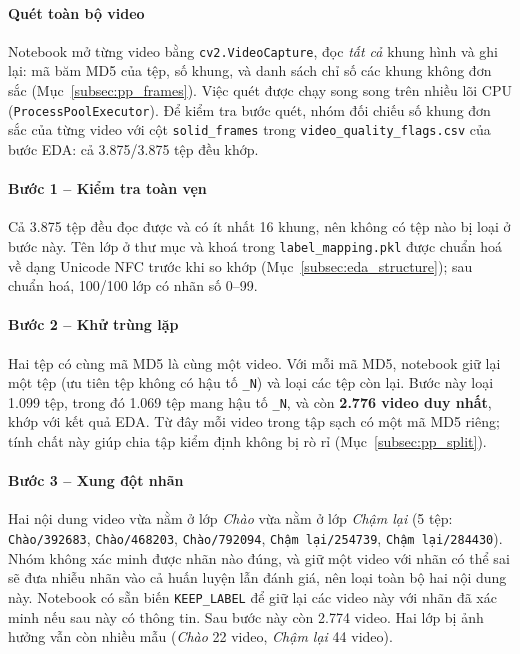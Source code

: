 \paragraph{Quét toàn bộ video} Notebook mở từng video bằng \texttt{cv2.VideoCapture}, đọc \emph{tất cả} khung hình và ghi lại: mã băm MD5 của tệp, số khung, và danh sách chỉ số các khung không đơn sắc (Mục~\ref{subsec:pp_frames}). Việc quét được chạy song song trên nhiều lõi CPU (\texttt{ProcessPoolExecutor}). Để kiểm tra bước quét, nhóm đối chiếu số khung đơn sắc của từng video với cột \texttt{solid\_frames} trong \texttt{video\_quality\_flags.csv} của bước EDA: cả 3.875/3.875 tệp đều khớp.

\paragraph{Bước 1 -- Kiểm tra toàn vẹn} Cả 3.875 tệp đều đọc được và có ít nhất 16 khung, nên không có tệp nào bị loại ở bước này. Tên lớp ở thư mục và khoá trong \texttt{label\_mapping.pkl} được chuẩn hoá về dạng Unicode NFC trước khi so khớp (Mục~\ref{subsec:eda_structure}); sau chuẩn hoá, 100/100 lớp có nhãn số 0--99.

\paragraph{Bước 2 -- Khử trùng lặp} Hai tệp có cùng mã MD5 là cùng một video. Với mỗi mã MD5, notebook giữ lại một tệp (ưu tiên tệp không có hậu tố \texttt{\_N}) và loại các tệp còn lại. Bước này loại 1.099 tệp, trong đó 1.069 tệp mang hậu tố \texttt{\_N}, và còn \textbf{2.776 video duy nhất}, khớp với kết quả EDA. Từ đây mỗi video trong tập sạch có một mã MD5 riêng; tính chất này giúp chia tập kiểm định không bị rò rỉ (Mục~\ref{subsec:pp_split}).

\paragraph{Bước 3 -- Xung đột nhãn} Hai nội dung video vừa nằm ở lớp \textit{Chào} vừa nằm ở lớp \textit{Chậm lại} (5 tệp: \texttt{Chào/392683}, \texttt{Chào/468203}, \texttt{Chào/792094}, \texttt{Chậm lại/254739}, \texttt{Chậm lại/284430}). Nhóm không xác minh được nhãn nào đúng, và giữ một video với nhãn có thể sai sẽ đưa nhiễu nhãn vào cả huấn luyện lẫn đánh giá, nên loại toàn bộ hai nội dung này. Notebook có sẵn biến \texttt{KEEP\_LABEL} để giữ lại các video này với nhãn đã xác minh nếu sau này có thông tin. Sau bước này còn 2.774 video. Hai lớp bị ảnh hưởng vẫn còn nhiều mẫu (\textit{Chào} 22 video, \textit{Chậm lại} 44 video).

